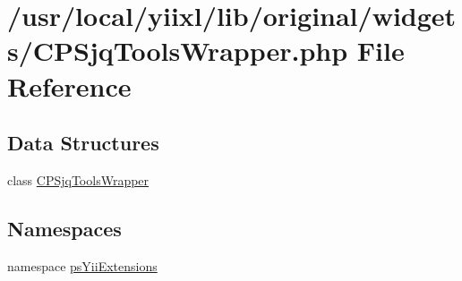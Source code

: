 \hypertarget{CPSjqToolsWrapper_8php}{
\section{/usr/local/yiixl/lib/original/widgets/CPSjqToolsWrapper.php File Reference}
\label{CPSjqToolsWrapper_8php}
}
\subsection*{Data Structures}
\begin{DoxyCompactItemize}
\item 
class \hyperlink{classCPSjqToolsWrapper}{CPSjqToolsWrapper}
\end{DoxyCompactItemize}
\subsection*{Namespaces}
\begin{DoxyCompactItemize}
\item 
namespace \hyperlink{namespacepsYiiExtensions}{psYiiExtensions}
\end{DoxyCompactItemize}
